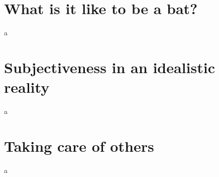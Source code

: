 \section{What is it like to be a bat?}
a


\section{Subjectiveness in an idealistic reality}
a


\section{Taking care of others}
a

